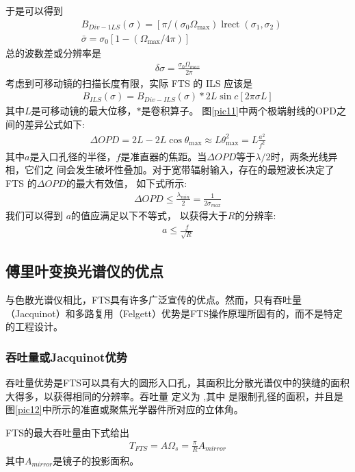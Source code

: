 \documentclass[conference]{IEEEtran}
\begin{document}
于是可以得到
\begin{align}
    &B_{D i v-1 L S}(\sigma)=\left[\pi /\left(\sigma_{0} \Omega_{\max }\right) \operatorname{lrect}\left(\sigma_{1}, \sigma_{2}\right)\right. \\
    &\bar{\sigma}=\sigma_{0}\left[1-\left(\Omega_{\max } / 4 \pi\right)\right]
\end{align}
总的波数差或分辨率是
\begin{align*}
    \delta \sigma = \frac{\sigma_0\Omega_{max}}{2\pi}
\end{align*}
考虑到可移动镜的扫描长度有限，实际 FTS 的 ILS 应该是
\begin{align}
    B_{I L S}(\sigma)=B_{D i v-I L S}(\sigma) * 2 L \sin c[2 \pi \sigma L]
\end{align}
其中$L$是可移动镜的最大位移，$*$是卷积算子。
图\ref{pic11}中两个极端射线的OPD之间的差异公式如下:
\begin{align*}
    \Delta O P D=2 L-2 L \cos \theta_{\max } \approx L \theta_{\max }^{2}=L \frac{a^{2}}{ f^{2}}
\end{align*}
其中$a$是入口孔径的半径，$f$是准直器的焦距。当$\Delta OPD$等于$\lambda/2$时，两条光线异相，它们之
间会发生破坏性叠加。对于宽带辐射输入，存在的最短波长决定了 FTS 的$\Delta OPD$的最大有效值， 如下式所示:
\begin{align}
    \Delta OPD \leq \frac{\lambda_{min}}{2} = \frac{1}{2\sigma_{max}}
\end{align}
我们可以得到 $a$的值应满足以下不等式， 以获得大于$R$的分辨率:
\begin{align}
    a \leq \frac{f}{\sqrt{R}}
\end{align}


\subsection{傅里叶变换光谱仪的优点}
与色散光谱仪相比，FTS具有许多广泛宣传的优点。然而，只有吞吐量（Jacquinot）和多路复用（Felgett）优势是FTS操作原理所固有的，而不是特定的工程设计。
\subsubsection{吞吐量或Jacquinot优势} 吞吐量优势是FTS可以具有大的圆形入口孔，其面积比分散光谱仪中的狭缝的面积大得多，以获得相同的分辨率。吞吐量 定义为 ,其中 是限制孔径的面积，并且是图\ref{pic12}中所示的准直或聚焦光学器件所对应的立体角。

FTS的最大吞吐量由下式给出
\begin{align}
    T_{FTS} = A\Omega_s = \frac{\pi}{R}A_{mirror}
\end{align}
其中$A_{mirror}$是镜子的投影面积。
\end{document}
